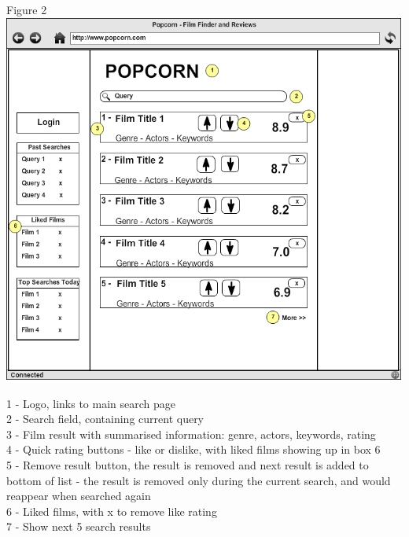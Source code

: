 \documentclass{sig-alt-release2}
\begin{document}
Figure 2\\
\includegraphics[scale=0.3]{wireframe2.png}
 
1 - Logo, links to main search page \\
2 - Search field, containing current query \\
3 - Film result with summarised information: genre, actors, keywords, rating \\
4 - Quick rating buttons - like or dislike, with liked films showing up in box 6 \\
5 - Remove result button, the result is removed and next result is added to bottom of list - the result is removed only during the current search, and would reappear when searched again \\
6 - Liked films, with x to remove like rating \\
7 - Show next 5 search results\\
\end{document}
